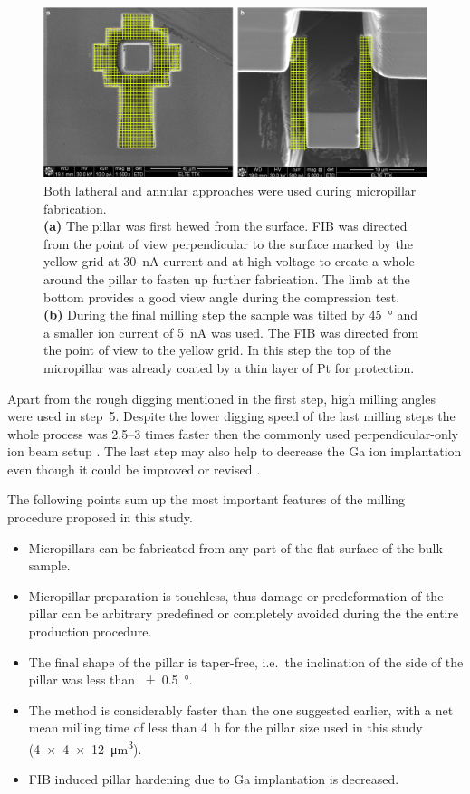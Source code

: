 \begin{figure}[htbp!] 
\centering    
\includegraphics[width=1\textwidth]{Micron-Scale_Deformation2}
\caption[Raw and final pillar fabrication]{Both latheral and annular approaches were used during micropillar fabrication.\\
\textbf{(a)} The pillar was first hewed from the surface. FIB was directed from the point of view perpendicular to the surface marked by the yellow grid at \SI{30}{nA} current and at high voltage to create a whole around the pillar to fasten up further fabrication. The limb at the bottom provides a good view angle during the compression test. \\
\textbf{(b)} During the final milling step the sample was tilted by \SI{45}{\degree} and a smaller ion current of \SI{5}{nA} was used. The FIB was directed from the point of view to the yellow grid. In this step the top of the micropillar was already coated by a thin layer of Pt for protection.}
\label{fig:FIB_approaches}
\end{figure}

Apart from the rough digging mentioned in the first step, high milling angles were used in step~5. Despite the lower digging speed of the last milling steps the whole process was \numrange{2.5}{3} times faster then the commonly used perpendicular-only ion beam setup \cite{doi:10.1093/jmicro/dfh078}. The last step may also help to decrease the Ga ion implantation \cite{bei2007effects} even though it could be improved or revised \cite{greer2008comment}.

The following points sum up the most important features of the milling procedure proposed in this study.\begin{itemize}
\item Micropillars can be fabricated from any part of the flat surface of the bulk sample.
\item Micropillar preparation is touchless, thus damage or predeformation of the pillar can be arbitrary predefined or completely avoided during the the entire production procedure.
\item The final shape of the pillar is taper-free, i.e.\ the inclination of the side of the pillar was less than \SI{\pm0.5}{\degree}.
\item The method is considerably faster than the one suggested earlier, with a net mean milling time of less than \SI{4}{\hour} for the pillar size used in this study (\num{4 x 4 x 12}~\si{\micro m^3}).
\item FIB induced pillar hardening due to Ga implantation is decreased.
\end{itemize}

